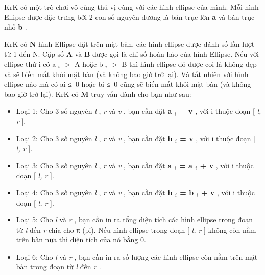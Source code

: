 





   KrK có một trò chơi vô cùng thú vị cùng với các hình ellipse của mình. Mỗi hình Ellipse được đặc trưng bởi 2 con số nguyên dương là bán trục lớn   \textbf{    a   }   và bán trục nhỏ   \textbf{    b   }   .  

   KrK có   \textbf{    N   }   hình Ellipse đặt trên mặt bàn, các hình ellipse được đánh số lần lượt từ 1 đến N. Cặp số   \textbf{    A   }   và   \textbf{    B   }   được gọi là chỉ số hoàn hảo của hình Ellipse. Nếu với ellipse thứ i có a   $_    i   $   $>$ A hoặc b   $_    i   $   $>$ B thì hình ellipse đó được coi là không đẹp và sẽ biến mất khỏi mặt bàn (và không bao giờ trở lại). Và tất nhiên với hình ellipse nào mà có ai ≤ 0 hoặc bi ≤ 0 cũng sẽ biến mất khỏi mặt bàn (và không bao giờ trở lại). KrK có   \textbf{    M   }   truy vấn dành cho bạn như sau:  


\begin{itemize}
	\item     Loại 1: Cho 3 số nguyên    \emph{     l    }    ,    \emph{     r    }    và    \emph{     v    }    , bạn cần đặt    \textbf{     a     $_      i     $     = v    }    , với i thuộc đoạn [    \emph{     l, r    }    ].   
	\item     Loại 2: Cho 3 số nguyên    \emph{     l    }    ,    \emph{     r    }    và    \emph{     v    }    , bạn cần đặt    \textbf{     b     $_      i     $     = v    }    , với i thuộc đoạn [    \emph{     l, r    }    ].   
	\item     Loại 3: Cho 3 số nguyên    \emph{     l    }    ,    \emph{     r    }    và    \emph{     v    }    , bạn cần đặt    \textbf{     a     $_      i     $     = a     $_      i     $     + v    }    , với i thuộc đoạn [    \emph{     l, r    }    ].   
	\item     Loại 4: Cho 3 số nguyên    \emph{     l    }    ,    \emph{     r    }    và    \emph{     v    }    , bạn cần đặt    \textbf{     b     $_      i     $     = b     $_      i     $     + v    }    , với i thuộc đoạn [    \emph{     l, r    }    ].   
	\item     Loại 5: Cho    \emph{     l    }    và    \emph{     r    }    , bạn cần in ra tổng diện tích các hình ellipse trong đoạn từ    \emph{     l    }    đến    \emph{     r    }    chia cho π (pi). Nếu hình ellipse trong đoạn [    \emph{     l, r    }    ] không còn nằm trên bàn nữa thì diện tích của nó bằng 0.   
	\item     Loại 6: Cho    \emph{     l    }    và    \emph{     r    }    , bạn cần in ra số lượng các hình ellipse còn nằm trên mặt bàn trong đoạn từ    \emph{     l    }    đến    \emph{     r    }    .   
\end{itemize}



